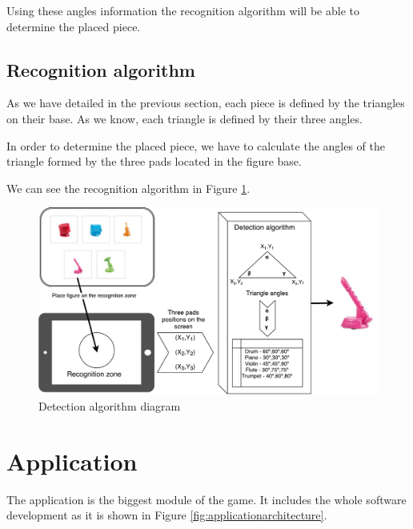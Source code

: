 Using these angles information the recognition algorithm will be able to determine the placed piece.

\newpage
\subsection{Recognition algorithm}
\label{sec:recognitionalgorithm}
As we have detailed in the previous section, each piece is defined by the triangles on their base. As we know, each triangle is defined by their three angles.

In order to determine the placed piece, we have to calculate the angles of the triangle formed by the three pads located in the figure base.

We can see the recognition algorithm in Figure \ref{fig:detectionalgorithm}.

\begin{figure}[ht!]
	\centering
	\includegraphics[width=400pt]{graphics/architecture/DetectionAlgorithm.pdf}
	\caption{Detection algorithm diagram}
	\label{fig:detectionalgorithm}
\end{figure}

\newpage
\section{Application}
\label{sec:application}
The application is the biggest module of the game. It includes the whole software development as it is shown in Figure \ref{fig:applicationarchitecture}.


